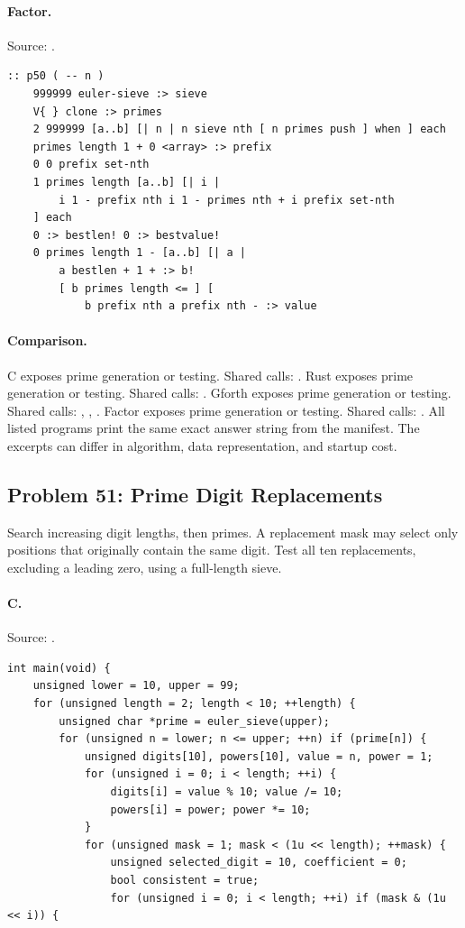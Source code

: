\paragraph{Factor.} Source: .
\begin{lstlisting}
:: p50 ( -- n )
    999999 euler-sieve :> sieve
    V{ } clone :> primes
    2 999999 [a..b] [| n | n sieve nth [ n primes push ] when ] each
    primes length 1 + 0 <array> :> prefix
    0 0 prefix set-nth
    1 primes length [a..b] [| i |
        i 1 - prefix nth i 1 - primes nth + i prefix set-nth
    ] each
    0 :> bestlen! 0 :> bestvalue!
    0 primes length 1 - [a..b] [| a |
        a bestlen + 1 + :> b!
        [ b primes length <= ] [
            b prefix nth a prefix nth - :> value
\end{lstlisting}

\paragraph{Comparison.}
C exposes prime generation or testing. Shared calls: \texttt{}. Rust exposes prime generation or testing. Shared calls: \texttt{}. Gforth exposes prime generation or testing. Shared calls: \texttt{}, \texttt{}, \texttt{}. Factor exposes prime generation or testing. Shared calls: \texttt{}.
All listed programs print the same exact answer string from the manifest. The excerpts can differ in algorithm, data representation, and startup cost.

\subsection{Problem 51: Prime Digit Replacements}
\label{walkthrough:p51}
Search increasing digit lengths, then primes. A replacement mask may select only positions that originally contain the same digit. Test all ten replacements, excluding a leading zero, using a full-length sieve.

\paragraph{C.} Source: .
\begin{lstlisting}
int main(void) {
    unsigned lower = 10, upper = 99;
    for (unsigned length = 2; length < 10; ++length) {
        unsigned char *prime = euler_sieve(upper);
        for (unsigned n = lower; n <= upper; ++n) if (prime[n]) {
            unsigned digits[10], powers[10], value = n, power = 1;
            for (unsigned i = 0; i < length; ++i) {
                digits[i] = value % 10; value /= 10;
                powers[i] = power; power *= 10;
            }
            for (unsigned mask = 1; mask < (1u << length); ++mask) {
                unsigned selected_digit = 10, coefficient = 0;
                bool consistent = true;
                for (unsigned i = 0; i < length; ++i) if (mask & (1u << i)) {
\end{lstlisting}


